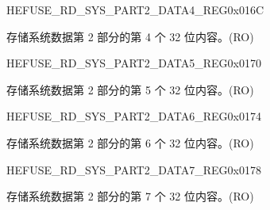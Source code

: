 \begin{register}{H}{EFUSE\_RD\_SYS\_PART2\_DATA4\_REG}{0x016C}\label{regdesc:EFUSERDSYSPART2DATA4REG}
%
\regnewline%
\begin{regdesc}\begin{reglist}
\label{fielddesc:EFUSESYSDATAPART24}\item [EFUSE\_SYS\_DATA\_PART2\_4] 存储系统数据第 2 部分的第 4 个 32 位内容。(RO)
\end{reglist}\end{regdesc}
\end{register}


\begin{register}{H}{EFUSE\_RD\_SYS\_PART2\_DATA5\_REG}{0x0170}\label{regdesc:EFUSERDSYSPART2DATA5REG}
%
\regnewline%
\begin{regdesc}\begin{reglist}
\label{fielddesc:EFUSESYSDATAPART25}\item [EFUSE\_SYS\_DATA\_PART2\_5] 存储系统数据第 2 部分的第 5 个 32 位内容。(RO)
\end{reglist}\end{regdesc}
\end{register}


\begin{register}{H}{EFUSE\_RD\_SYS\_PART2\_DATA6\_REG}{0x0174}\label{regdesc:EFUSERDSYSPART2DATA6REG}
%
\regnewline%
\begin{regdesc}\begin{reglist}
\label{fielddesc:EFUSESYSDATAPART26}\item [EFUSE\_SYS\_DATA\_PART2\_6] 存储系统数据第 2 部分的第 6 个 32 位内容。(RO)
\end{reglist}\end{regdesc}
\end{register}


\begin{register}{H}{EFUSE\_RD\_SYS\_PART2\_DATA7\_REG}{0x0178}\label{regdesc:EFUSERDSYSPART2DATA7REG}
%
\regnewline%
\begin{regdesc}\begin{reglist}
\label{fielddesc:EFUSESYSDATAPART27}\item [EFUSE\_SYS\_DATA\_PART2\_7] 存储系统数据第 2 部分的第 7 个 32 位内容。(RO)
\end{reglist}\end{regdesc}
\end{register}


